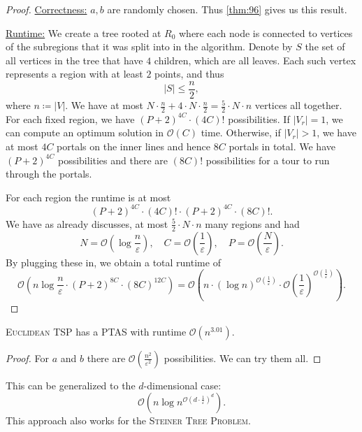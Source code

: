 \documentclass[../skript.tex]{subfiles}
\begin{document}
\begin{proof}
\underline{Correctness:} $a, b$ are randomly chosen. Thus \cref{thm:96} gives us this result.

\underline{Runtime:} We create a tree rooted at $R_0$ where each node is connected to vertices of the subregions that it was split into in the algorithm.
Denote by $S$ the set of all vertices in the tree that have $4$ children, which are all leaves.
Each such vertex represents a region with at least $2$ points, and thus
\[
	|S| \leq \frac{n}{2},
\]
where $n \coloneqq |V|$.
We have at most $N \cdot \frac{n}{2} + 4 \cdot N \cdot \frac{n}{2} = \frac{5}{2} \cdot N \cdot n$ vertices all together.
For each fixed region, we have $(P+2)^{4C} \cdot (4C)!$ possibilities.
If $|V_r| = 1$, we can compute an optimum solution in $\mathcal{O}(C)$ time.
Otherwise, if $|V_r| > 1$, we have at most $4C$ portals on the inner lines and hence $8C$ portals in total.
We have $(P+2)^{4C}$ possibilities and there are $(8C)!$ possibilities for a tour to run through the portals.

For each region the runtime is at most
\[
	(P+2)^{4C} \cdot (4C)! \cdot (P+2)^{4C} \cdot (8C)!.
\]
We have as already discusses, at most $\frac{5}{2} \cdot N \cdot n$ many regions and had
\[
	N = \mathcal{O} \left( \log \frac{n}{\varepsilon} \right), \quad C = \mathcal{O}\left( \frac{1}{\varepsilon} \right), \quad P = \mathcal{O} \left( \frac{N}{\varepsilon} \right).
\]
By plugging these in, we obtain a total runtime of
\[
\mathcal{O} \left( n \log \frac{n}{\varepsilon} \cdot (P+2)^{8C} \cdot (8C)^{12C} \right) = \mathcal{O} \left( n \cdot (\log n)^{\mathcal{O}\left( \frac{1}{\varepsilon} \right)} \cdot \mathcal{O}\left( \frac{1}{\varepsilon} \right)^{\mathcal{O}\left( \frac{1}{\varepsilon} \right)} \right).
\]
\end{proof}
\begin{theorem} %
\label{thm:98}
\textsc{Euclidean TSP} has a \ac{PTAS} with runtime $\mathcal{O}\left(n^{3.01} \right)$.
\end{theorem}
\begin{proof}
For $a$ and $b$ there are $\mathcal{O} \left( \frac{n^2}{\varepsilon^2} \right)$ possibilities. We can try them all.
\end{proof}
This can be generalized to the $d$-dimensional case:
\[
	\mathcal{O}\left(n \log n^{\mathcal{O} \left( d \cdot \frac{1}{\varepsilon} \right)^d}\right).
\]
This approach also works for the \textsc{Steiner Tree Problem}.
\end{document}
